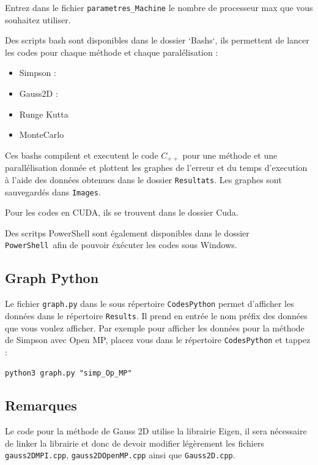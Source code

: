 \documentclass[10pt,a4paper]{article}
\begin{document}
Entrez dans le fichier \verb|parametres_Machine| le nombre de processeur max que vous souhaitez utiliser.

Des scripts bash sont disponibles dans le dossier `Bashs`, ils permettent de lancer les codes pour chaque méthode et chaque paralélisation : 
\begin{itemize}
  \item Simpson : 
  \item Gauss2D :
  \item Runge Kutta 
  \item MonteCarlo 
\end{itemize}

Ces bashs compilent et executent le code $C_{++}$ pour une méthode et une parallélisation donnée et plottent les graphes de l'erreur et du temps d'execution à l'aide des données obtenues dans le dossier \verb|Resultats|. Les graphes sont sauvegardés dans \verb|Images|.

Pour les codes en CUDA, ils se trouvent dans le dossier Cuda.

Des scritps PowerShell sont également disponibles dans le dossier \verb|PowerShell| afin de pouvoir éxécuter les codes sous Windows.

\subsection{Graph Python}

Le fichier \verb|graph.py| dans le sous répertoire \verb|CodesPython| permet d'afficher les données dans le répertoire \verb|Results|. 
Il prend en entrée le nom préfix des données que vous voulez afficher.
Par exemple pour afficher les données pour la méthode de Simpson avec Open MP, placez vous dans le répertoire \verb|CodesPython| et tappez : 
\begin{center}
\verb|python3 graph.py "simp_Op_MP"|
\end{center}

\subsection{Remarques}
Le code pour la méthode de Gauss 2D utilise la librairie Eigen, il sera nécessaire de linker la librairie et donc de devoir modifier légèrement les fichiers \verb|gauss2DMPI.cpp|, \verb|gauss2DOpenMP.cpp| ainsi que \verb|Gauss2D.cpp|.
\end{document}
